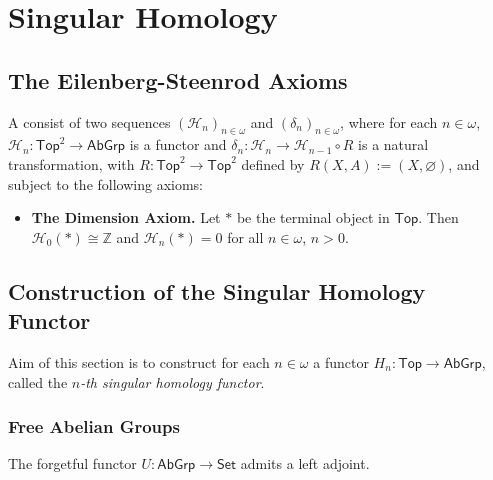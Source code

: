 \chapter{Singular Homology}
\section*{The Eilenberg-Steenrod Axioms}

\begin{definition}
	A  consist of two sequences $(\mathcal{H}_n)_{n \in \omega}$ and $(\delta_n)_{n \in \omega}$, where for each $n \in \omega$, $\mathcal{H}_n : \mathsf{Top}^2 \to \mathsf{AbGrp}$ is a functor and $\delta_n : \mathcal{H}_n \to \mathcal{H}_{n - 1} \circ R$ is a natural transformation, with $R : \mathsf{Top}^2 \to \mathsf{Top}^2$ defined by $R(X,A) := (X,\varnothing)$, and subject to the following axioms:
	\begin{itemize}[wide = 0pt]
		\item \textbf{The Dimension Axiom.} Let $\ast$ be the terminal object in $\mathsf{Top}$. Then $\mathcal{H}_0(\ast) \cong \mathbb{Z}$ and $\mathcal{H}_n(\ast) = 0$ for all $n \in \omega$, $n > 0$. 
	\end{itemize}
\end{definition}


\section*{Construction of the Singular Homology Functor}

Aim of this section is to construct for each $n \in \omega$ a functor $H_n : \mathsf{Top} \to \mathsf{AbGrp}$, called the \textit{$n$-th singular homology functor}.

\subsection*{Free Abelian Groups}

\begin{proposition}
	The forgetful functor $U : \mathsf{AbGrp} \to \mathsf{Set}$ admits a left adjoint.
	\label{prop:F_set_abgrp}
\end{proposition}

